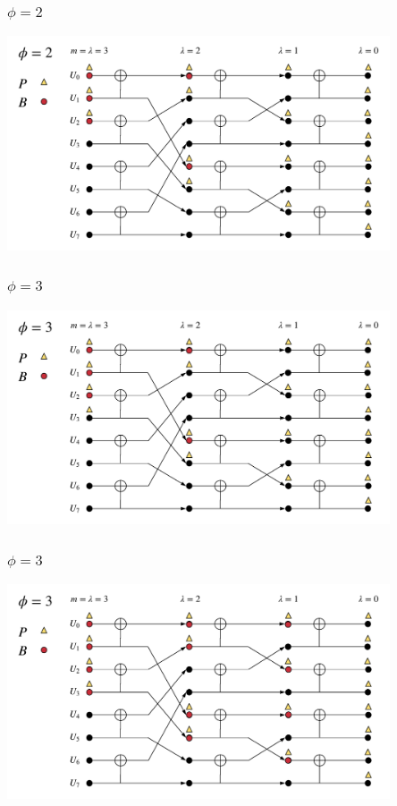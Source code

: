 \documentclass{beamer}
\begin{document}
\begin{frame}
\frametitle{$\phi=2$}
  \begin{center}
  \includegraphics[width=0.85\textwidth]{scl_pics/UpdateB_2.png}
  \end{center}
\end{frame}

\begin{frame}
\frametitle{$\phi=3$}
  \begin{center}
  \includegraphics[width=0.85\textwidth]{scl_pics/CalcP_3.png}
  \end{center}
\end{frame}

\begin{frame}
\frametitle{$\phi=3$}
  \begin{center}
  \includegraphics[width=0.85\textwidth]{scl_pics/UpdateB_3.png}
  \end{center}
\end{frame}
\end{document}
